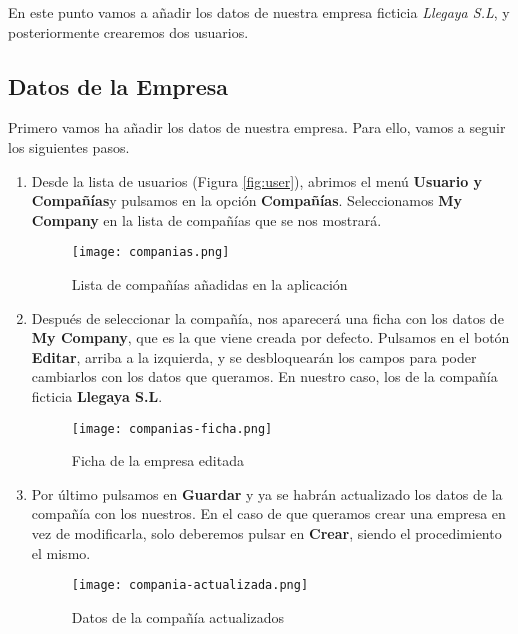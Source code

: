 En este punto vamos a añadir los datos de nuestra empresa ficticia \textit{Llegaya S.L}, y posteriormente crearemos dos usuarios.

\subsection{Datos de la Empresa}
Primero vamos ha añadir los datos de nuestra empresa. Para ello, vamos a seguir los siguientes pasos.

\begin{enumerate}
    \item Desde la lista de usuarios (Figura \ref{fig:user}), abrimos el menú \textbf{Usuario y Compañías}y  pulsamos en la opción \textbf{Compañías}. Seleccionamos \textbf{My Company} en la lista de compañías que se nos mostrará.

    \begin{figure}[ht]
        \centering
        \texttt{[image: companias.png]}
        \caption{Lista de compañías añadidas en la aplicación}
    \end{figure}

    \vspace{5ex}

   \item Después de seleccionar la compañía, nos aparecerá una ficha con los datos de \textbf{My Company}, que es la que viene creada por defecto. Pulsamos en el botón \textbf{Editar}, arriba a la izquierda, y se desbloquearán los campos para poder cambiarlos con los datos que queramos. En nuestro caso, los de la compañía ficticia \textbf{Llegaya S.L}.

   \begin{figure}[ht]
       \centering
       \texttt{[image: companias-ficha.png]}
       \caption{Ficha de la empresa editada}
   \end{figure}

   \item Por último pulsamos en \textbf{Guardar} y ya se habrán actualizado los datos de la compañía con los nuestros. En el caso de que queramos crear una empresa en vez de modificarla, solo deberemos pulsar en \textbf{Crear}, siendo el procedimiento el mismo.

   \begin{figure}[ht]
       \centering
       \texttt{[image: compania-actualizada.png]}
       \caption{Datos de la compañía actualizados}
   \end{figure}
\end{enumerate}

